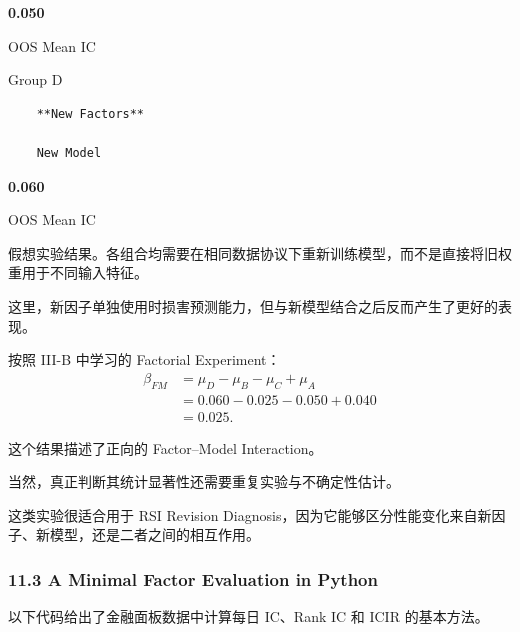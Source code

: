 \textbf{0.050}

OOS Mean IC

Group D

\begin{verbatim}
    **New Factors**

    New Model
\end{verbatim}

\textbf{0.060}

OOS Mean IC

假想实验结果。各组合均需要在相同数据协议下重新训练模型，而不是直接将旧权重用于不同输入特征。

这里，新因子单独使用时损害预测能力，但与新模型结合之后反而产生了更好的表现。

按照 III-B 中学习的 Factorial Experiment：
\[\begin{aligned}
\beta_{FM}
&=\mu_D-\mu_B-\mu_C+\mu_A\\
&=0.060-0.025-0.050+0.040\\
&=0.025.
\end{aligned}\]

这个结果描述了正向的 Factor--Model Interaction。

当然，真正判断其统计显著性还需要重复实验与不确定性估计。

这类实验很适合用于 RSI Revision Diagnosis，因为它能够区分性能变化来自新因子、新模型，还是二者之间的相互作用。

\hypertarget{part-4-63-0001-a-minimal-factor-evaluation-in-python}{%
\subsubsection{11.3 A Minimal Factor Evaluation in Python}\label{part-4-63-0001-a-minimal-factor-evaluation-in-python}}

以下代码给出了金融面板数据中计算每日 IC、Rank IC 和 ICIR 的基本方法。

